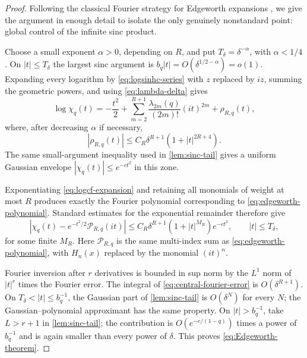 \documentclass[11pt,a4paper]{article}
\theoremstyle{definition}
\newcommand{\1}{\mathbf{1}}
\begin{document}
\begin{proof}
Following the classical Fourier strategy for Edgeworth expansions
\cite{BhattacharyaRao,Petrov}, we give the argument in enough detail to isolate the only genuinely
nonstandard point: global control of the infinite sinc product.

Choose a small exponent $\alpha>0$, depending on $R$, and put
$T_\delta=\delta^{-\alpha}$, with $\alpha<1/4$.  On
$|t|\le T_\delta$ the largest sinc argument is
$b_q|t|=O(\delta^{1/2-\alpha})=o(1)$.  Expanding every logarithm by
\eqref{eq:logsinhc-series} with $z$ replaced by $iz$, summing the geometric
powers, and using \eqref{eq:lambda-delta} gives
\begin{equation}
 \log\chi_q(t)
 =-\frac{t^2}{2}
 +\sum_{m=2}^{R+1}
   \frac{\lambda_{2m}(q)}{(2m)!}(it)^{2m}
 +\rho_{R,q}(t),
 \label{eq:logcf-expansion}
\end{equation}
where, after decreasing $\alpha$ if necessary,
\begin{equation}
 |\rho_{R,q}(t)|
 \le C_R\delta^{R+1}(1+|t|^{2R+4}).
 \label{eq:logcf-remainder}
\end{equation}
The same small-argument inequality used in \cref{lem:sinc-tail} gives a
uniform Gaussian envelope $|\chi_q(t)|\le e^{-ct^2}$ in this zone.

Exponentiating \eqref{eq:logcf-expansion} and retaining all monomials of
weight at most $R$ produces exactly the Fourier polynomial corresponding to
\eqref{eq:edgeworth-polynomial}.  Standard estimates for the exponential
remainder therefore give
\begin{equation}
 \left|\chi_q(t)-e^{-t^2/2}\mathcal P_{R,q}(it)\right|
 \le C_R\delta^{R+1}(1+|t|^{M_R})e^{-ct^2},
 \qquad |t|\le T_\delta,
 \label{eq:central-fourier-error}
\end{equation}
for some finite $M_R$.  Here $\mathcal P_{R,q}$ is the same multi-index sum
as \eqref{eq:edgeworth-polynomial}, with $H_n(x)$ replaced by the monomial
$(it)^n$.

Fourier inversion after $r$ derivatives is bounded in sup norm by the
$L^1$ norm of $|t|^r$ times the Fourier error.  The integral of
\eqref{eq:central-fourier-error} is $O(\delta^{R+1})$.  On
$T_\delta<|t|\le b_q^{-1}$, the Gaussian part of
\cref{lem:sinc-tail} is $O(\delta^N)$ for every $N$; the Gaussian--polynomial
approximant has the same property.  On $|t|>b_q^{-1}$, take
$L>r+1$ in \cref{lem:sinc-tail}; the contribution is
$O(e^{-c/(1-q)})$ times a power of $b_q^{-1}$ and is again smaller than every
power of $\delta$.  This proves \eqref{eq:Edgeworth-theorem}.
\end{proof}
\end{document}
